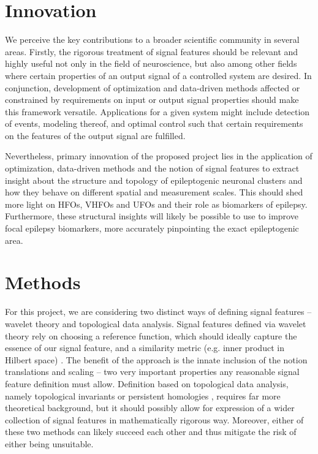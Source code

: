 \documentclass[a4paper,11pt]{scrartcl}
\begin{document}
\section{Innovation}\label{sec:innovation}

We perceive the key contributions to a broader scientific community in several areas. Firstly, the rigorous treatment of signal features should be relevant and highly useful not only in the field of neuroscience, but also among other fields where certain properties of an output signal of a controlled system are desired. In conjunction, development of optimization and data-driven methods affected or constrained by requirements on input or output signal properties should make this framework versatile. Applications for a given system might include detection of events, modeling thereof, and optimal control such that certain requirements on the features of the output signal are fulfilled.

Nevertheless, primary innovation of the proposed project lies in the application of optimization, data-driven methods and the notion of signal features to extract insight about the structure and topology of epileptogenic neuronal clusters and how they behave on different spatial and measurement scales. This should shed more light on \acp{HFO}, \acp{VHFO} and \acp{UFO} and their role as biomarkers of epilepsy. Furthermore, these structural insights will likely be possible to use to improve focal epilepsy biomarkers, more accurately pinpointing the exact epileptogenic area.


\section{Methods}\label{sec:methods}

For this project, we are considering two distinct ways of defining signal features -- wavelet theory and topological data analysis. Signal features defined via wavelet theory rely on choosing a reference function, which should ideally capture the essence of our signal feature, and a similarity metric (e.g. inner product in Hilbert space) \cite{Ganjalizadeh2022, Brochard2022, Rocha2011}. The benefit of the approach is the innate inclusion of the notion translations and scaling \cite{Mallat2009} -- two very important properties any reasonable signal feature definition must allow. Definition based on topological data analysis, namely topological invariants or persistent homologies \cite{Carriere2021, Myers2022}, requires far more theoretical background, but it should possibly allow for expression of a wider collection of signal features in mathematically rigorous way. Moreover, either of these two methods can likely succeed each other and thus mitigate the risk of either being unsuitable.
\end{document}
